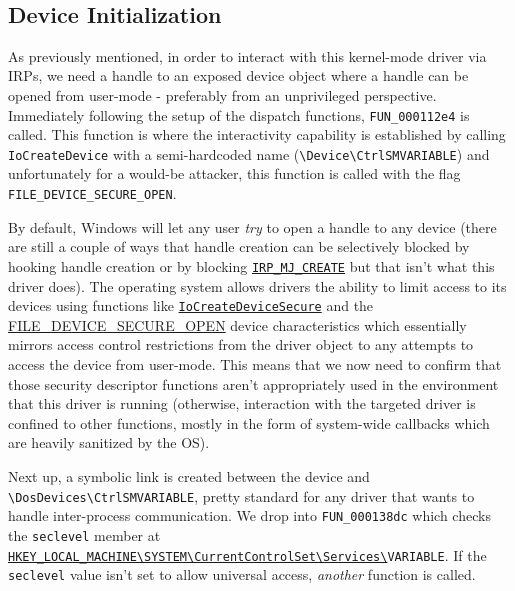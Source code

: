 \medskip

\\

\subsection{Device Initialization}

As previously mentioned, in order to interact with this kernel-mode driver via IRPs, we need a handle to an exposed
            device object where a handle can be opened from user-mode - preferably from an unprivileged perspective.
        \\

            Immediately following the setup of the dispatch functions, \texttt{FUN\_000112e4} is called. This function
            is where the interactivity capability is established by calling \texttt{IoCreateDevice}
            with a semi-hardcoded name (\texttt{\textbackslash{}Device\textbackslash{}CtrlSMVARIABLE})
            and unfortunately for a would-be attacker, this function is called with the flag \texttt{FILE\_DEVICE\_SECURE\_OPEN}.

By default, Windows will let any user \textit{try} to open a handle to any device (there are still a couple of ways that handle creation can be selectively blocked
            by hooking handle creation or by blocking \texttt{\href{https://learn.microsoft.com/en-us/windows-hardware/drivers/kernel/irp-mj-create}{IRP\_MJ\_CREATE}} but that isn't what this driver does).
            The operating system allows drivers the ability to limit access to its devices using functions like \texttt{\href{https://learn.microsoft.com/en-us/windows-hardware/drivers/ddi/wdmsec/nf-wdmsec-wdmlibiocreatedevicesecure}{IoCreateDeviceSecure}}
            and the \href{https://learn.microsoft.com/en-us/windows-hardware/drivers/kernel/controlling-device-namespace-access}{FILE\_DEVICE\_SECURE\_OPEN} device characteristics
            which essentially mirrors access control restrictions from the driver object to any attempts to access the device from user-mode. This means that we now need to confirm
            that those security descriptor functions aren't appropriately used in the environment that this driver is running (otherwise, interaction with the targeted driver
            is confined to other functions, mostly in the form of system-wide callbacks which are heavily sanitized by the OS).

Next up, a symbolic link is created between the device and \texttt{\textbackslash{}DosDevices\textbackslash{}CtrlSMVARIABLE}, pretty standard for
            any driver that wants to handle inter-process communication.
            We drop into \texttt{FUN\_000138dc} which checks the \texttt{seclevel} member at \texttt{\href{https://www.netfiltersdk.com/help/nfsdk2/nfapi_registry.htm}{HKEY\_LOCAL\_MACHINE\textbackslash{}SYSTEM\textbackslash{}CurrentControlSet\textbackslash{}Services\textbackslash{}}VARIABLE}.
            If the \texttt{seclevel} value isn't set to allow universal access, \textit{another} function is called.

